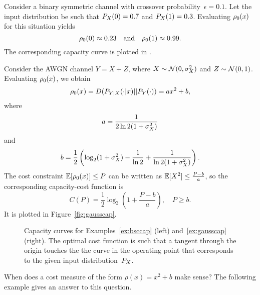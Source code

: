 \begin{example}[BSC]
  \label{ex:bsccap}
  Consider a binary symmetric channel with crossover
  probability~$\epsilon=0.1$. Let the input distribution be such that $P_X(0) =
  0.7$ and $P_X(1) = 0.3$. Evaluating ${\rho_0}(x)$ for this situation yields
  \begin{equation*}
    {\rho_0}(0) \approx 0.23 \quad\text{and} \quad
    {\rho_0}(1) \approx 0.99.
  \end{equation*}
  The corresponding capacity curve is plotted in .
\end{example}

\begin{example}[Gaussian]
  \label{ex:gausscap}
  Consider the AWGN channel $Y=X+Z$, where $X \sim {\mathcal{N}}(0,{\sigma_X^2})$ and $Z \sim
  {\mathcal{N}}(0,1)$. Evaluating ${\rho_0}(x)$, we obtain
  \[ {\rho_0}(x) = D(P_{Y|X}(\cdot|x)||P_Y(\cdot)) = ax^2 + b, \]
  where
  \[ a = \frac{1}{2 \ln2 (1+{\sigma_X^2})} \]
  and
  \[ b = \frac12 \left( \log_2(1+{\sigma_X^2}) - \frac{1}{\ln2} +
  \frac{1}{\ln 2 (1+{\sigma_X^2})} \right). \]
  The cost constraint $\mathbb{E}[{\rho_0}(x)] \le P$ can be written as $\mathbb{E}[X^2] \le
  \frac{P-b}{a}$, so the corresponding capacity-cost function is
  \[ C(P) = \frac12 \log_2 (1 + \frac{P-b}{a}), \quad P \ge b. \]
  It is plotted in Figure~\ref{fig:gausscap}.
\end{example}

\begin{figure}
  \centerline{%
  \subfloat[BSC]{\label{fig:bsccap}}%
  \hfil%
  \subfloat[Gaussian]{\label{fig:gausscap}}%
  }%
  \caption{Capacity curves for Examples~\ref{ex:bsccap} (left)
  and~\ref{ex:gausscap} (right). The optimal cost function is such that a
  tangent through the origin touches the the curve in the operating point
  that corresponds to the given input distribution~$P_X$.}
\end{figure}

When does a cost measure of the form $\rho(x) = x^2 + b$ make sense? The
following example gives an answer to this question. 

